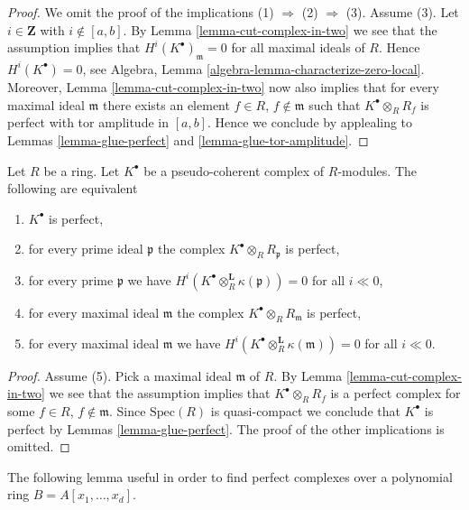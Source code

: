 \begin{proof}
We omit the proof of the implications (1) $\Rightarrow$ (2) $\Rightarrow$ (3).
Assume (3). Let $i \in \mathbf{Z}$ with $i \not \in [a, b]$. By
Lemma \ref{lemma-cut-complex-in-two}
we see that the assumption implies that $H^i(K^\bullet)_{\mathfrak m} = 0$
for all maximal ideals of $R$. Hence $H^i(K^\bullet) = 0$, see
Algebra, Lemma \ref{algebra-lemma-characterize-zero-local}.
Moreover,
Lemma \ref{lemma-cut-complex-in-two}
now also implies that for every maximal ideal
$\mathfrak m$ there exists an element $f \in R$, $f \not \in \mathfrak m$
such that $K^\bullet \otimes_R R_f$ is perfect with tor amplitude in
$[a, b]$. Hence we conclude by applealing to
Lemmas \ref{lemma-glue-perfect} and \ref{lemma-glue-tor-amplitude}.
\end{proof}

\begin{lemma}
\label{lemma-check-perfect-stalks}
Let $R$ be a ring. Let $K^\bullet$ be a pseudo-coherent
complex of $R$-modules. The following are equivalent
\begin{enumerate}
\item $K^\bullet$ is perfect,
\item for every prime ideal $\mathfrak p$ the complex
$K^\bullet \otimes_R R_{\mathfrak p}$ is perfect,
\item for every prime $\mathfrak p$ we have
$H^i(K^\bullet \otimes_R^{\mathbf{L}} \kappa(\mathfrak p)) = 0$ for all
$i \ll 0$,
\item for every maximal ideal $\mathfrak m$ the complex
$K^\bullet \otimes_R R_{\mathfrak m}$ is perfect,
\item for every maximal ideal $\mathfrak m$ we have
$H^i(K^\bullet \otimes_R^{\mathbf{L}} \kappa(\mathfrak m)) = 0$ for all
$i \ll 0$.
\end{enumerate}
\end{lemma}

\begin{proof}
Assume (5). Pick a maximal ideal $\mathfrak m$ of $R$. By
Lemma \ref{lemma-cut-complex-in-two}
we see that the assumption implies that $K^\bullet \otimes_R R_f$
is a perfect complex for some $f \in R$, $f \not \in \mathfrak m$.
Since $\text{Spec}(R)$ is quasi-compact we conclude that $K^\bullet$
is perfect by
Lemmas \ref{lemma-glue-perfect}.
The proof of the other implications is omitted.
\end{proof}

\noindent
The following lemma useful in order to find perfect complexes
over a polynomial ring $B = A[x_1, \ldots, x_d]$.


